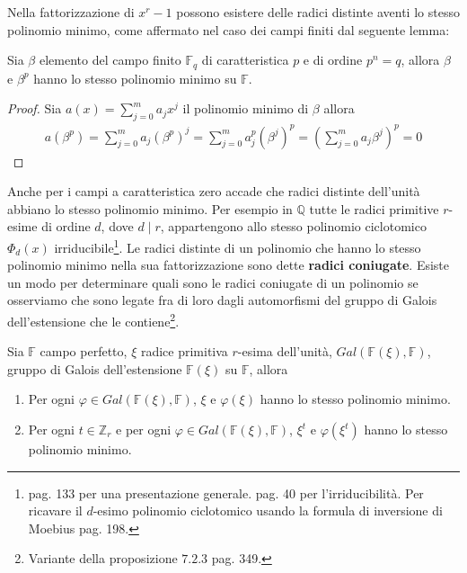 Nella fattorizzazione di $x^r - 1$ possono esistere delle radici distinte
aventi lo stesso polinomio minimo, come affermato nel caso dei campi finiti dal
seguente lemma:
\begin{lemmax} \label{le:lemmaGalois}
   Sia $\beta$ elemento del campo finito $\mathbb{F}_{q}$ di
caratteristica $p$ e di ordine $p^n=q$, allora $\beta$ e $\beta^{p}$ hanno lo
stesso polinomio minimo su $\mathbb{F}$.
\end{lemmax}
\begin{proof}
   Sia $a(x) = \sum_{j=0}^{m} a_{j}x^j$ il polinomio minimo di $\beta$
   allora 
   \begin{align*}
      a(\beta^p ) = \sum_{j=0}^{m} a_{j} (\beta^p)^j 
                  = \sum_{j=0}^{m} a_{j}^p (\beta^j)^p 
                  = (\sum_{j=0}^{m} a_{j} \beta^j )^p 
                  = 0
   \end{align*}
\end{proof}
\noindent
Anche per i campi a caratteristica zero accade che radici distinte
dell'unità abbiano lo stesso polinomio minimo. Per esempio in $\mathbb{Q}$ tutte
le radici primitive $r$-esime di ordine $d$, dove $d \mid r$, appartengono allo stesso polinomio ciclotomico $\Phi_{d}(x)$ irriducibile\footnote{\cite{cattaneo}
pag. 133 per una presentazione generale. \cite{milne} pag. 40 per 
l'irriducibilità. Per ricavare il $d$-esimo polinomio ciclotomico usando la formula di inversione di Moebius \cite{sivarama} pag. 198.}.
Le radici distinte di un polinomio che hanno lo
stesso polinomio minimo nella sua fattorizzazione sono dette {\bf radici coniugate}.
Esiste un modo per determinare quali sono le radici coniugate di un polinomio
se osserviamo che sono legate fra di loro dagli automorfismi del gruppo di Galois
dell'estensione che le contiene\footnote{Variante della
proposizione $7.2.3$ \cite{cattaneo} pag. 349.}.
\begin{teorema}\label{teo:stesseRadici}
Sia $\mathbb{F}$ campo perfetto, $\xi$ radice primitiva $r$-esima
dell'unità, $Gal(\mathbb{F}(\xi), \mathbb{F})$, gruppo di Galois
dell'estensione $\mathbb{F}(\xi) $ su $ \mathbb{F}$, allora
\begin{enumerate}
   \item Per ogni $\varphi \in Gal(\mathbb{F}(\xi), \mathbb{F})$, $\xi$ e $\varphi(\xi)$ hanno lo stesso
polinomio minimo.
   \item Per ogni $t \in \mathbb{Z}_{r}$ e per ogni $\varphi \in Gal(\mathbb{F}(\xi), \mathbb{F})$, $\xi^{t}$ e
$\varphi(\xi^{t})$ hanno lo stesso polinomio minimo.
\end{enumerate}
\end{teorema}
